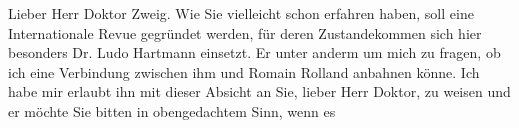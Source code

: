 \pstart\center{}Lieber Herr Doktor Zweig.\pend\vspace{0.5em}
\pstart
           Wie Sie vielleicht schon erfahren haben, soll eine Internationale Revue gegründet
               werden, für deren Zustandekommen sich hier besonders Dr. Ludo Hartmann einsetzt. Er \label{K_L03776-1v}\label{K_L03776-1} unter anderm um mich zu fragen, ob ich
               eine Verbindung zwischen ihm und Romain
                  Rolland anbahnen könne. Ich habe mir erlaubt ihn mit dieser Absicht an Sie,
               lieber Herr Doktor, zu weisen und er möchte Sie bitten in obengedachtem Sinn, wenn es
